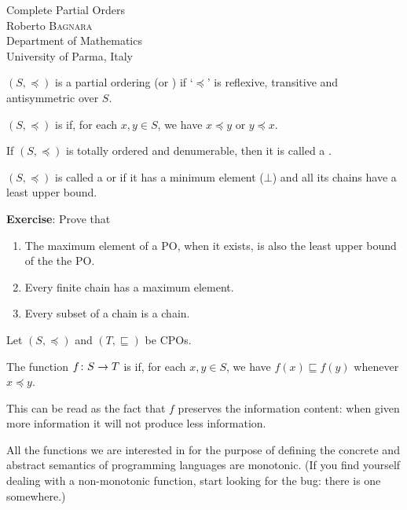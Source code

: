 \documentclass[online,helvetica,a4]{chaksem}
\begin{document}
\begin{slide}
  \vspace*{-.9\bigskipamount}
  \begin{center}
    \vspace*{\fill}
    \huge
    {\dblue Complete Partial Orders}
    \\[1.2em]
    \large
    {\dgreen Roberto \textsc{Bagnara}} \\
             Department of Mathematics \\
             University of Parma, Italy \\
  \end{center}%
  \vspace*{-.5\bigskipamount}
\end{slide}


\begin{slide} 

$(S, \preceq)$ is a partial ordering (or ) if `$\preceq$'
is reflexive, transitive and antisymmetric over $S$.

$(S, \preceq)$ is  if, for each $x, y \in S$,
we have $x \preceq y$ or $y \preceq x$.

If $(S, \preceq)$ is totally ordered and denumerable, then it
is called a .

$(S, \preceq)$ is called a  or 
if it has a minimum element ($\bot$) and all its chains
have a least upper bound.

\vfill
\textbf{Exercise}: Prove that
\begin{enumerate} 
\item
The maximum element of a PO, when it exists, is also the least upper bound of the the PO.
\item
Every finite chain has a maximum element.
\item
Every subset of a chain is a chain.
\end{enumerate}
\end{slide}

\begin{slide} 

Let $(S, \preceq)$ and $(T, \sqsubseteq)$ be CPOs.

The function $\mathord{f}\colon S\to T$ is  if, for each $x, y \in S$,
we have $f(x) \sqsubseteq f(y)$ whenever $x \preceq y$.

This can be read as the fact that $f$ preserves the information content:
when given more information it will not produce less information.

All the functions we are interested in for the purpose of defining the
concrete and abstract semantics of programming languages are monotonic.
(If you find yourself dealing with a non-monotonic function, start
looking for the bug: there is one somewhere.)
\end{slide}
\end{document}

